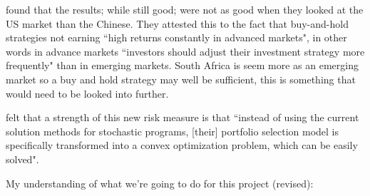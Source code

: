 \documentclass[12pt,a4paper]{article}
\begin{document}
\cite{CHEN20111777} found that the results; while still good; were not as good when they looked at the US market than the Chinese. They attested this to the fact that buy-and-hold strategies not earning ``high returns constantly in advanced markets", in other words in advance markets ``investors should adjust their investment strategy more frequently" than in emerging markets. South Africa is seem more as an emerging market so a buy and hold strategy may well be sufficient, this is something that would need to be looked into further.

\cite{CHEN20111777} felt that a strength of this new risk measure is that ``instead of using the current solution methods for stochastic programs, [their] portfolio selection model is specifically transformed into a convex optimization problem, which can be easily solved".




My understanding of what we're going to do for this project (revised):
\end{document}
